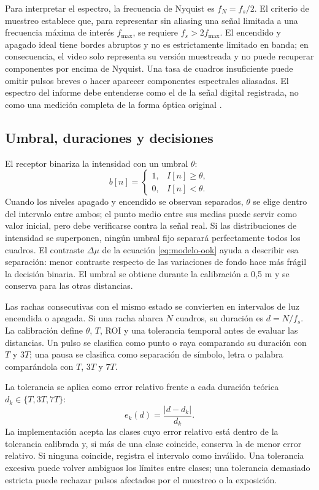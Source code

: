 \documentclass[11pt,a4paper]{article}
\begin{document}
Para interpretar el espectro, la frecuencia de Nyquist es \(f_N=f_s/2\). El criterio de muestreo establece que, para representar sin aliasing una señal limitada a una frecuencia máxima de interés \(f_{\max}\), se requiere \(f_s>2f_{\max}\). El encendido y apagado ideal tiene bordes abruptos y no es estrictamente limitado en banda; en consecuencia, el video solo representa su versión muestreada y no puede recuperar componentes por encima de Nyquist. Una tasa de cuadros insuficiente puede omitir pulsos breves o hacer aparecer componentes espectrales aliasadas. El espectro del informe debe entenderse como el de la señal digital registrada, no como una medición completa de la forma óptica original \cite{NI,Bachhuber}.

\subsection{Umbral, duraciones y decisiones}
El receptor binariza la intensidad con un umbral \(\theta\):
\begin{equation}
b[n]=
\begin{cases}
1,& I[n]\geq\theta,\\
0,& I[n]<\theta.
\end{cases}
\end{equation}
Cuando los niveles apagado y encendido se observan separados, \(\theta\) se elige dentro del intervalo entre ambos; el punto medio entre sus medias puede servir como valor inicial, pero debe verificarse contra la señal real. Si las distribuciones de intensidad se superponen, ningún umbral fijo separará perfectamente todos los cuadros. El contraste \(\Delta\mu\) de la ecuación \eqref{eq:modelo-ook} ayuda a describir esa separación: menor contraste respecto de las variaciones de fondo hace más frágil la decisión binaria. El umbral se obtiene durante la calibración a 0,5 m y se conserva para las otras distancias.

Las rachas consecutivas con el mismo estado se convierten en intervalos de luz encendida o apagada. Si una racha abarca \(N\) cuadros, su duración es \(d=N/f_s\). La calibración define \(\theta\), \(T\), ROI y una tolerancia temporal antes de evaluar las distancias. Un pulso se clasifica como punto o raya comparando su duración con \(T\) y \(3T\); una pausa se clasifica como separación de símbolo, letra o palabra comparándola con \(T\), \(3T\) y \(7T\).

La tolerancia se aplica como error relativo frente a cada duración teórica \(d_k\in\{T,3T,7T\}\):
\begin{equation}
e_k(d)=\frac{|d-d_k|}{d_k}.
\end{equation}
La implementación acepta las clases cuyo error relativo está dentro de la tolerancia calibrada y, si más de una clase coincide, conserva la de menor error relativo. Si ninguna coincide, registra el intervalo como inválido. Una tolerancia excesiva puede volver ambiguos los límites entre clases; una tolerancia demasiado estricta puede rechazar pulsos afectados por el muestreo o la exposición.
\end{document}
